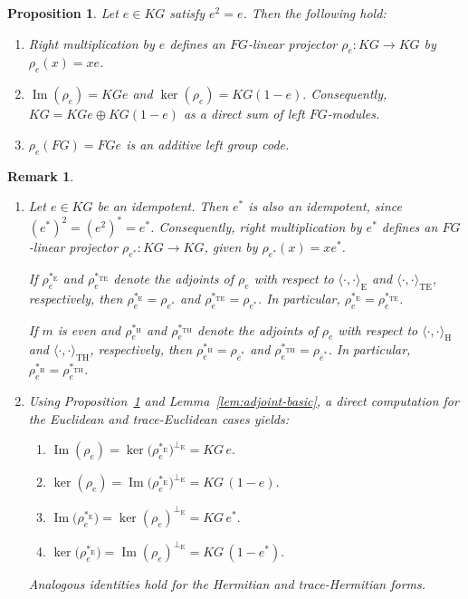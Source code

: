 \documentclass[10pt,a4paper]{amsart}
\newtheorem{proposition}{Proposition}
\newtheorem{remark}{Remark}
\begin{document}
\begin{proposition}\label{idempotent-projector}
Let $e\in KG$ satisfy $e^2=e$. Then the following hold:
\begin{enumerate}
    \item Right multiplication by $e$ defines an $FG$-linear projector $\rho_e:KG\longrightarrow KG$ by $\rho_e(x)=xe$.
    \item $
\operatorname{Im}(\rho_e)=KGe$ and $
\ker(\rho_e)=KG(1-e).
$ Consequently,
$
KG=KGe\oplus KG(1-e)
$
as a direct sum of left $FG$-modules.
\item $
\rho_e(FG)=FGe$ is an additive left group code.
\end{enumerate}
\end{proposition}

\begin{remark}\label{propiedades-adjunto}
\begin{enumerate}
\item Let $e\in KG$ be an idempotent. Then $e^\ast$ is also an idempotent, since $(e^\ast)^2=(e^2)^\ast=e^\ast$. Consequently, right multiplication by $e^\ast$ defines an $FG$-linear projector $\rho_{e^\ast}:KG\longrightarrow KG$, given by $\rho_{e^\ast}(x)=xe^\ast$.

If $\rho_e^{\ast_{\mathrm E}}$ and $\rho_e^{\ast_{\mathrm{TE}}}$ denote the adjoints of $\rho_e$ with respect to $\langle\cdot,\cdot\rangle_{\mathrm E}$ and $\langle\cdot,\cdot\rangle_{\mathrm{TE}}$, respectively, then $\rho_e^{\ast_{\mathrm E}}=\rho_{e^\ast}$ and $\rho_e^{\ast_{\mathrm{TE}}}=\rho_{e^\ast}$. In particular, $\rho_e^{\ast_{\mathrm E}}=\rho_e^{\ast_{\mathrm{TE}}}$.

If $m$ is even and $\rho_e^{\ast_{\mathrm H}}$ and $\rho_e^{\ast_{\mathrm{TH}}}$ denote the adjoints of $\rho_e$ with respect to $\langle\cdot,\cdot\rangle_{\mathrm H}$ and $\langle\cdot,\cdot\rangle_{\mathrm{TH}}$, respectively, then $\rho_e^{\ast_{\mathrm H}}=\rho_{\overline e^\ast}$ and $\rho_e^{\ast_{\mathrm{TH}}}=\rho_{\overline e^\ast}$. In particular, $\rho_e^{\ast_{\mathrm H}}=\rho_e^{\ast_{\mathrm{TH}}}$.

\item Using Proposition~\ref{idempotent-projector} and  Lemma~\ref{lem:adjoint-basic}, a direct computation for the Euclidean and trace-Euclidean cases yields:
\begin{enumerate}
    \item $\operatorname{Im}(\rho_e) = \ker\big(\rho_e^{\ast_{\mathrm E}}\big)^{\perp_{\mathrm E}} = KG\,e.$
    \item $\ker(\rho_e) = \operatorname{Im}\big(\rho_e^{\ast_{\mathrm E}}\big)^{\perp_{\mathrm E}} = KG\,(1 - e).$
    \item $\operatorname{Im}\big(\rho_e^{\ast_{\mathrm E}}\big) = \ker(\rho_e)^{\perp_{\mathrm E}} = KG\,e^{\ast}.$
    \item $\ker\big(\rho_e^{\ast_{\mathrm E}}\big) = \operatorname{Im}(\rho_e)^{\perp_{\mathrm E}} = KG\,(1 - e^{\ast}).$
\end{enumerate}

Analogous identities hold for the Hermitian and trace-Hermitian forms.
\end{enumerate}
\end{remark}
\end{document}
